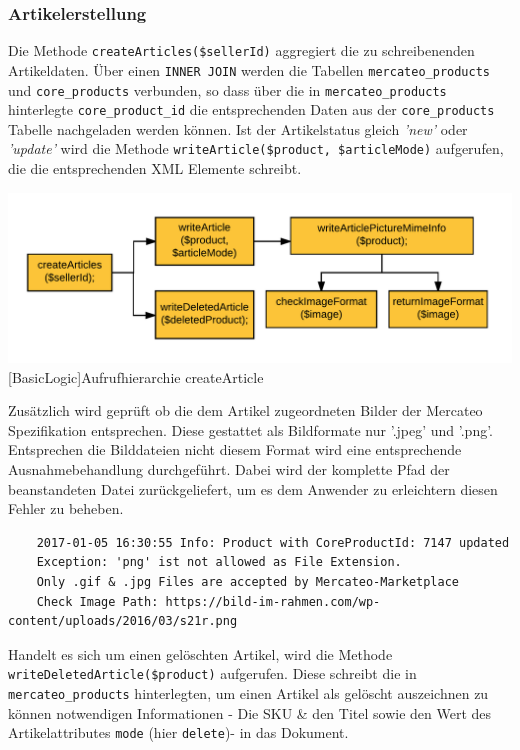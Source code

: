 	\subsubsection{Artikelerstellung}
	
	Die Methode \texttt{createArticles(\$sellerId)} aggregiert die zu schreibenenden Artikeldaten. Über einen \texttt{INNER JOIN} werden die Tabellen \texttt{mercateo\_products} und \texttt{core\_products} verbunden, so dass über die in \texttt{mercateo\_products} hinterlegte \texttt{core\_product\_id} die entsprechenden Daten aus der \texttt{core\_products} Tabelle nachgeladen werden können. 
	Ist der Artikelstatus gleich \textit{'new'} oder \textit{'update'} wird die Methode \texttt{writeArticle(\$product, \$articleMode)} aufgerufen, die die entsprechenden XML Elemente schreibt. \\
		
		\begin{minipage}{\linewidth}
			\vspace{1em}
			\centering
			\includegraphics[width=0.7 \linewidth]{img/createArticleHierarchie}
			[BasicLogic]{Aufrufhierarchie createArticle}
			\vspace{1em}
		\end{minipage}
	
	Zusätzlich wird geprüft ob die dem Artikel zugeordneten Bilder der Mercateo Spezifikation entsprechen. Diese gestattet als Bildformate nur '.jpeg' und '.png'. Entsprechen die Bilddateien nicht diesem Format wird eine entsprechende Ausnahmebehandlung durchgeführt. Dabei wird der komplette Pfad der beanstandeten Datei zurückgeliefert, um es dem Anwender zu erleichtern diesen Fehler zu beheben.\\
	
	\begin{lstlisting}
	2017-01-05 16:30:55 Info: Product with CoreProductId: 7147 updated
	Exception: 'png' ist not allowed as File Extension.
	Only .gif & .jpg Files are accepted by Mercateo-Marketplace
	Check Image Path: https://bild-im-rahmen.com/wp-content/uploads/2016/03/s21r.png
	\end{lstlisting}

	Handelt es sich um einen gelöschten Artikel, wird die Methode \texttt{writeDeletedArticle(\$pro\-duct)} aufgerufen. Diese schreibt die in \texttt{mercateo\_products} hinterlegten, um einen Artikel als gelöscht auszeichnen zu können notwendigen Informationen - Die SKU \& den Titel sowie den Wert des Artikelattributes \texttt{mode} (hier \texttt{delete})- in das Dokument.
	
